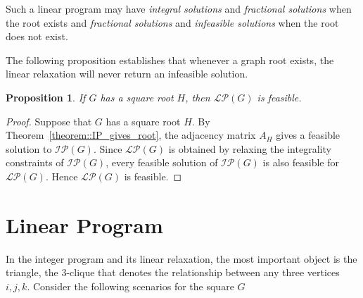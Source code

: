 \documentclass[11pt]{article}
\newtheorem{proposition}{Proposition}
\begin{document}
Such a linear program may have \emph{integral solutions} and \emph{fractional solutions} when the root exists and \emph{fractional solutions} and \emph{infeasible solutions} when the root does not exist. 

The following proposition establishes that whenever a graph root exists, the linear relaxation will never return an infeasible solution. 

\begin{proposition} \label{prop::linear_relaxation_feasibility}
  If $G$ has a square root $H$, then $\mathcal{LP}(G)$ is feasible. 
\end{proposition}

\begin{proof}
  Suppose that $G$ has a square root $H$. By Theorem~\ref{theorem::IP_gives_root}, the adjacency matrix $A_H$ gives a feasible solution to $\mathcal{IP}(G)$. Since $\mathcal{LP}(G)$ is obtained by relaxing the integrality constraints of $\mathcal{IP}(G)$, every feasible solution of $\mathcal{IP}(G)$ is also feasible for $\mathcal{LP}(G)$. Hence $\mathcal{LP}(G)$ is feasible.
\end{proof}

\section{Linear Program} \label{sec::LP}
In the integer program and its linear relaxation, the most important object is the triangle, the $3$-clique that denotes the relationship between any three vertices $i,j,k$. Consider the following scenarios for the square $G$
\end{document}
